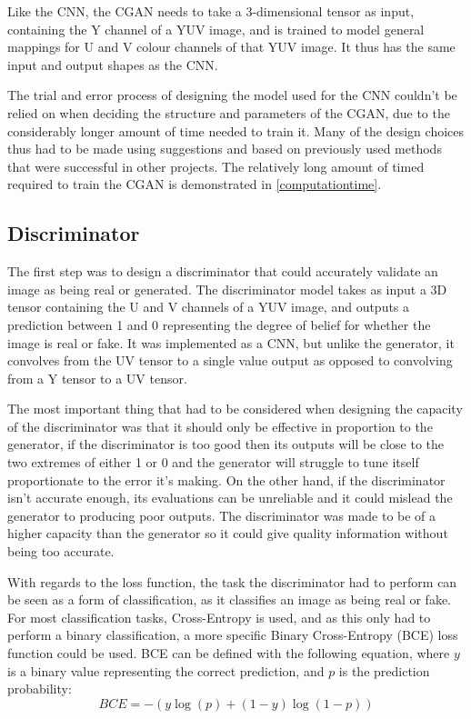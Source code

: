\documentclass{l4proj}
\begin{document}
Like the CNN, the CGAN needs to take a 3-dimensional tensor as input, containing the Y channel of a YUV image, and is trained to model general mappings for U and V colour channels of that YUV image. It thus has the same input and output shapes as the CNN.

The trial and error process of designing the model used for the CNN couldn't be relied on when deciding the structure and parameters of the CGAN, due to the considerably longer amount of time needed to train it. Many of the design choices thus had to be made using suggestions and based on previously used methods that were successful in other projects. The relatively long amount of timed required to train the CGAN is demonstrated in \ref{computationtime}.

\subsection{Discriminator}
The first step was to design a discriminator that could accurately validate an image as being real or generated. The discriminator model takes as input a 3D tensor containing the U and V channels of a YUV image, and outputs a prediction between 1 and 0 representing the degree of belief for whether the image is real or fake. It was implemented as a CNN, but unlike the generator, it convolves from the UV tensor to a single value output as opposed to convolving from a Y tensor to a UV tensor. 

The most important thing that had to be considered when designing the capacity of the discriminator was that it should only be effective in proportion to the generator, if the discriminator is too good then its outputs will be close to the two extremes of either 1 or 0 and the generator will struggle to tune itself proportionate to the error it's making. On the other hand, if the discriminator isn't accurate enough, its evaluations can be unreliable and it could mislead the generator to producing poor outputs. The discriminator was made to be of a higher capacity than the generator so it could give quality information without being too accurate. 

With regards to the loss function, the task the discriminator had to perform can be seen as a form of classification, as it classifies an image as being real or fake. For most classification tasks, Cross-Entropy is used, and as this only had to perform a binary classification, a more specific Binary Cross-Entropy (BCE) loss function could be used. BCE can be defined with the following equation, where $y$ is a binary value representing the correct prediction, and $p$ is the prediction probability:
\begin{equation}
    BCE = -{(y\log(p) + (1 - y)\log(1 - p))}
\end{equation}
\end{document}
